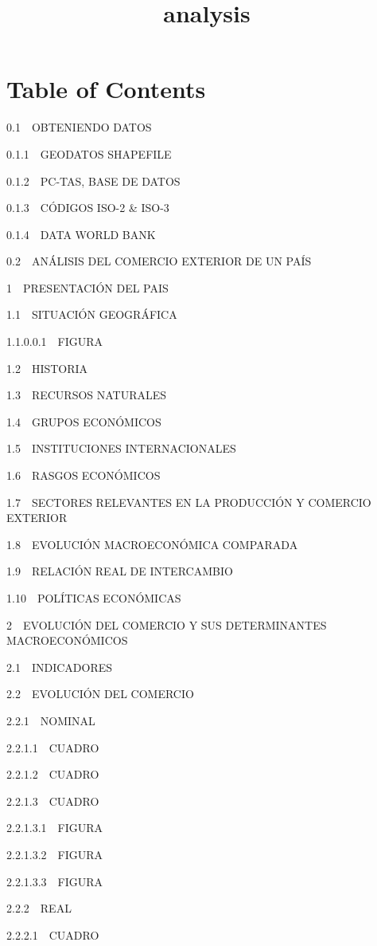 \documentclass[11pt]{article}
\title{analysis}
\begin{document}
    
    
    \maketitle
    
    

    
    \section{Table of Contents}\label{table-of-contents}

{0.1~~}OBTENIENDO DATOS

{0.1.1~~}GEODATOS SHAPEFILE

{0.1.2~~}PC-TAS, BASE DE DATOS

{0.1.3~~}CÓDIGOS ISO-2 \& ISO-3

{0.1.4~~}DATA WORLD BANK

{0.2~~}ANÁLISIS DEL COMERCIO EXTERIOR DE UN PAÍS

{1~~}PRESENTACIÓN DEL PAIS

{1.1~~}SITUACIÓN GEOGRÁFICA

{1.1.0.0.1~~}FIGURA

{1.2~~}HISTORIA

{1.3~~}RECURSOS NATURALES

{1.4~~}GRUPOS ECONÓMICOS

{1.5~~}INSTITUCIONES INTERNACIONALES

{1.6~~}RASGOS ECONÓMICOS

{1.7~~}SECTORES RELEVANTES EN LA PRODUCCIÓN Y COMERCIO EXTERIOR

{1.8~~}EVOLUCIÓN MACROECONÓMICA COMPARADA

{1.9~~}RELACIÓN REAL DE INTERCAMBIO

{1.10~~}POLÍTICAS ECONÓMICAS

{2~~}EVOLUCIÓN DEL COMERCIO Y SUS DETERMINANTES MACROECONÓMICOS

{2.1~~}INDICADORES

{2.2~~}EVOLUCIÓN DEL COMERCIO

{2.2.1~~}NOMINAL

{2.2.1.1~~}CUADRO

{2.2.1.2~~}CUADRO

{2.2.1.3~~}CUADRO

{2.2.1.3.1~~}FIGURA

{2.2.1.3.2~~}FIGURA

{2.2.1.3.3~~}FIGURA

{2.2.2~~}REAL

{2.2.2.1~~}CUADRO
\end{document}
